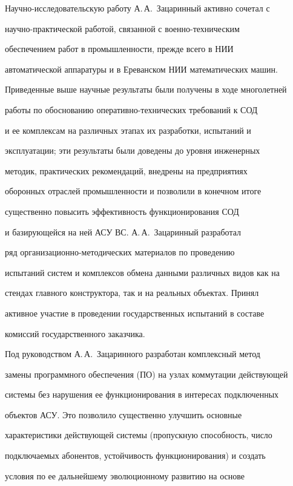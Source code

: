 Научно-исследовательскую работу А.\,А.~Зацаринный активно сочетал с 


на\-уч\-но-прак\-ти\-че\-ской работой, связанной с во\-ен\-но-тех\-ни\-че\-ским 


обеспечением работ в промышленности, прежде всего в НИИ 


автоматической аппаратуры и в Ереванском НИИ математических машин. 


Приведенные выше научные результаты были получены в ходе многолетней 


работы по обоснованию опе\-ра\-тив\-но-тех\-ни\-че\-ских требований к СОД 


и ее комплексам на различных этапах их разработки, испытаний и 


эксплуатации; эти результаты были доведены до уровня инженерных 


методик, практических рекомендаций, внедрены на предприятиях 


оборонных отраслей промышленности и позволили в конечном итоге 


существенно повысить эффективность функционирования СОД


и базирующейся на ней АСУ ВС. А.\,А.~Зацаринный разработал 


ряд орга\-ни\-за\-ци\-он\-но-ме\-то\-ди\-че\-ских материалов по проведению 


испытаний сис\-тем и комплексов обмена данными различных видов как на 


стендах главного конструктора, так и на реальных объектах. Принял 


активное участие в проведении государственных испытаний в составе 


комиссий государственного заказчика.





Под руководством А.\,А.~Зацаринного разработан комплексный метод 


замены программного обеспечения (ПО) на узлах коммутации действующей 


сис\-те\-мы без нарушения ее функционирования в интересах подключенных 


объектов АСУ. Это позволило существенно улучшить основные 


характеристики действующей сис\-те\-мы (пропускную способность, число 


подключаемых абонентов, устойчивость функционирования) и создать 


условия по ее дальнейшему эволюционному развитию на основе 


